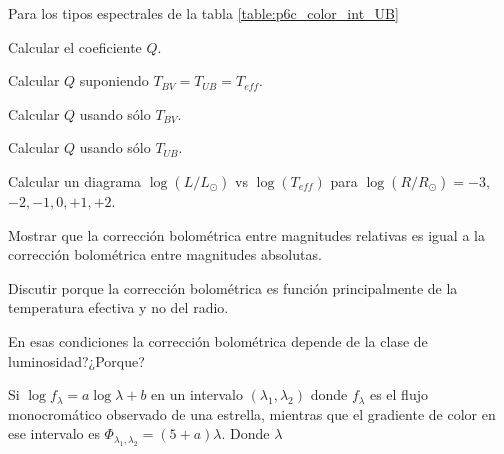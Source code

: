 \documentclass[12pt,a4paper]{practice}
\begin{document}
    \begin{problem}\label{prob:8}
        Para los tipos espectrales de la tabla \ref{table:p6c_color_int_UB}

            \begin{ppart}\label{prob:8:a}
                Calcular el coeficiente $Q$.
            \end{ppart}

            \begin{ppart}\label{prob:8:b}
                Calcular $Q$ suponiendo $T_{BV} = T_{UB} = T_{eff}$.
            \end{ppart}

            \begin{ppart}\label{prob:8:c}
                Calcular $Q$ usando sólo $T_{BV}$.
            \end{ppart}

            \begin{ppart}\label{prob:8:d}
                Calcular $Q$ usando sólo $T_{UB}$.
            \end{ppart}
    \end{problem}

    \newpage
    \begin{problem}\label{prob:9}
        \begin{ppart}\label{prob:9:a}
            Calcular un diagrama $\log (L/L_{\odot})$ vs $\log (T_{eff})$ para $\log \left(R/R_{\odot}\right) = -3,$ $-2,-1, 0, +1, +2$.
        \end{ppart}

        \begin{ppart}\label{prob:9:b}
            Mostrar que la corrección bolométrica entre magnitudes relativas es igual a la corrección bolométrica entre magnitudes absolutas.
        \end{ppart}
    \end{problem}

    \begin{problem}\label{prob:10}
        Discutir porque la corrección bolométrica es función principalmente de la temperatura efectiva y no del radio.

        En esas condiciones la corrección bolométrica depende de la clase de luminosidad?¿Porque?
    \end{problem}

    \begin{problem}\label{prob:11}
        Si $\log f_{\lambda} = a\log\lambda + b$ en un intervalo $(\lambda_{1}, \lambda_{2})$ donde $f_{\lambda}$ es el flujo monocromático observado de una estrella, mientras que el gradiente de color en ese intervalo es $\Phi _{\lambda_{1},\lambda_{2}} = \left(5+a\right)\lambda$. Donde $\lambda$
    \end{problem}
\end{document}
